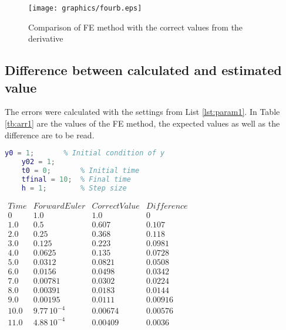 			\begin{figure}[H]
				\centering
				\texttt{[image: graphics/fourb.eps]}
				\caption{Comparison of FE method with the correct values from the derivative}
				\label{fig:pl1}
			\end{figure}
		
		
		\subsection{Difference between calculated and estimated value}
		The errors were calculated with the settings from List \ref{lst:param1}. In Table \ref{tb:arr1} are the values of the FE method, the expected values as well as the difference are to be read.

\begin{lstlisting}[caption={Parameters from the calculations}, language=matlab, backgroundcolor = \color{lgray}, label={lst:param1}]
	y0 = 1;       % Initial condition of y
	y02 = 1;
	t0 = 0;       % Initial time  
	tfinal = 10;  % Final time			
	h = 1;        % Step size
\end{lstlisting}			
			
			

			\begin{center}
			$\begin{array}{cccc} 
				Time & Forward Euler & Correct Value & Difference \\
				 0 & 1.0 & 1.0 & 0\\ 1.0 & 0.5 & 0.607 & 0.107\\ 
				 2.0 & 0.25 & 0.368 & 0.118\\ 3.0 & 0.125 & 0.223 & 0.0981\\ 4.0 & 0.0625 & 0.135 & 0.0728\\ 
				 5.0 & 0.0312 & 0.0821 & 0.0508\\ 
				 6.0 & 0.0156 & 0.0498 & 0.0342\\ 
				 7.0 & 0.00781 & 0.0302 & 0.0224\\ 
				 8.0 & 0.00391 & 0.0183 & 0.0144\\ 
				 9.0 & 0.00195 & 0.0111 & 0.00916\\ 
				 10.0 & 9.77\,{10}^{-4} & 0.00674 & 0.00576\\ 
				 11.0 & 4.88\,{10}^{-4} & 0.00409 & 0.0036
			
			\end{array}$
			\label{tb:arr1}
			\end{center}

